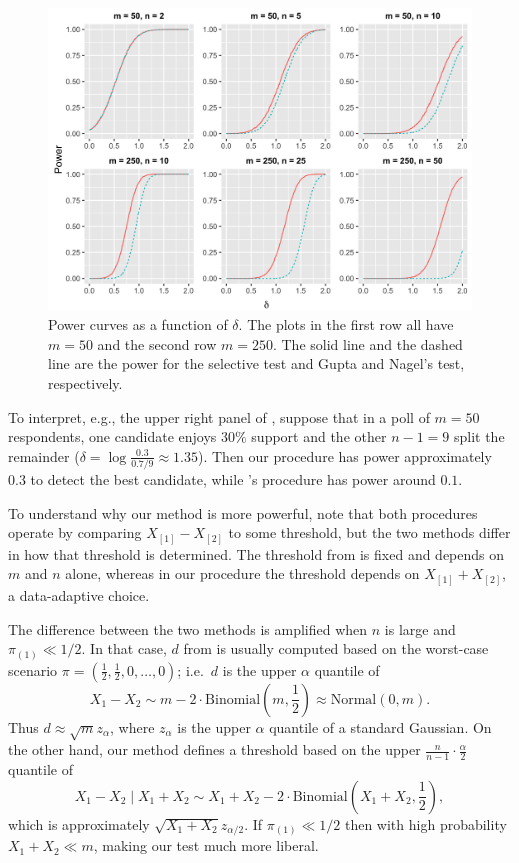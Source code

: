 \documentclass[11pt]{article}
\theoremstyle{definition}
\theoremstyle{custom}
\begin{document}
\begin{figure}[htbp]
\centering
\includegraphics[width = \textwidth]{multinomial-power}
\caption{Power curves as a function of $\delta$. The plots in the first row all have $m = 50$ and the second row $m = 250$. The solid line and the dashed line are the power for the selective test and Gupta and Nagel's test, respectively.}
\label{fig:power}
\end{figure}

To interpret, e.g., the upper right panel of , suppose that in a poll of $m = 50$ respondents, one candidate enjoys $30\%$ support and the other $n - 1 = 9$ split the remainder ($\delta = \log\frac{0.3}{0.7 / 9} \approx 1.35$). Then our procedure has power approximately $0.3$ to detect the best candidate, while \citeauthor{Gupta:1967wg}'s procedure has power around $0.1$.

To understand why our method is more powerful, note that both procedures operate by comparing $X_{[1]}-X_{[2]}$ to some threshold, but the two methods differ in how that threshold is determined. The threshold from \citet{Gupta:1967wg} is fixed and depends on $m$ and $n$ alone, whereas in our procedure the threshold depends on $X_{[1]}+X_{[2]}$, a data-adaptive choice. 

The difference between the two methods is amplified when $n$ is large and $\pi_{(1)} \ll 1/2$. In that case, $d$ from \citeauthor{Gupta:1967wg} is usually computed based on the worst-case scenario $\pi = \left(\frac{1}{2}, \frac{1}{2}, 0, \ldots, 0\right)$; i.e.\ $d$ is the upper $\alpha$ quantile of
\[X_1 - X_2 \sim m - 2 \cdot \text{Binomial}\left(m, \frac{1}{2}\right) \approx \text{Normal}\left(0, m\right).\]
Thus $d \approx \sqrt{m} z_\alpha$, where $z_\alpha$ is the upper $\alpha$ quantile of a standard Gaussian. On the other hand, our method defines a threshold based on the upper $\frac{n}{n-1} \cdot \frac{\alpha}{2}$ quantile of
\[X_1 - X_2 \mid X_1 + X_2 \sim X_1 + X_2 - 2 \cdot \text{Binomial}\left(X_1 + X_2, \frac{1}{2}\right),\]
which is approximately $\sqrt{X_1 + X_2} z_{\alpha / 2}$. If $\pi_{(1)} \ll 1/2$ then with high probability $X_1 + X_2 \ll  m$, making our test much more liberal.
\end{document}
